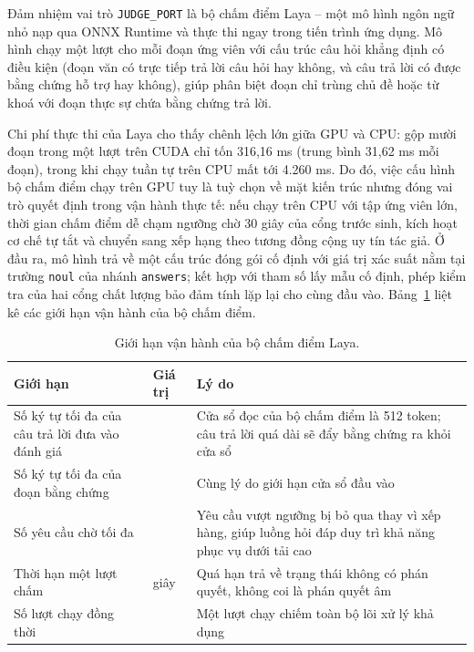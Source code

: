 Đảm nhiệm vai trò \texttt{JUDGE\_PORT} là bộ chấm điểm Laya -- một mô hình ngôn ngữ nhỏ nạp qua ONNX Runtime và thực thi ngay trong tiến trình ứng dụng. Mô hình chạy một lượt cho mỗi đoạn ứng viên với cấu trúc câu hỏi khẳng định có điều kiện (đoạn văn có trực tiếp trả lời câu hỏi hay không, và câu trả lời có được bằng chứng hỗ trợ hay không), giúp phân biệt đoạn chỉ trùng chủ đề hoặc từ khoá với đoạn thực sự chứa bằng chứng trả lời.

Chi phí thực thi của Laya cho thấy chênh lệch lớn giữa GPU và CPU: gộp mười đoạn trong một lượt trên CUDA chỉ tốn 316,16 ms (trung bình 31,62 ms mỗi đoạn), trong khi chạy tuần tự trên CPU mất tới 4.260 ms. Do đó, việc cấu hình bộ chấm điểm chạy trên GPU tuy là tuỳ chọn về mặt kiến trúc nhưng đóng vai trò quyết định trong vận hành thực tế: nếu chạy trên CPU với tập ứng viên lớn, thời gian chấm điểm dễ chạm ngưỡng chờ 30 giây của cổng trước sinh, kích hoạt cơ chế tự tắt và chuyển sang xếp hạng theo tương đồng cộng uy tín tác giả. Ở đầu ra, mô hình trả về một cấu trúc đóng gói cố định với giá trị xác suất nằm tại trường \texttt{noul} của nhánh \texttt{answers}; kết hợp với tham số lấy mẫu cố định, phép kiểm tra của hai cổng chất lượng bảo đảm tính lặp lại cho cùng đầu vào. Bảng~\ref{tab:gioi-han-bo-cham-diem} liệt kê các giới hạn vận hành của bộ chấm điểm.

\begin{table}[htbp]
    \centering
    \caption{Giới hạn vận hành của bộ chấm điểm Laya.}
    \label{tab:gioi-han-bo-cham-diem}
    \small
    \begin{tabularx}{\textwidth}{@{}>{\raggedright\arraybackslash}p{4.8cm}>{\raggedright\arraybackslash}p{2.3cm}>{\raggedright\arraybackslash}X@{}}
        \toprule
        \textbf{Giới hạn} & \textbf{Giá trị} & \textbf{Lý do} \\
        \midrule
        Số ký tự tối đa của câu trả lời đưa vào đánh giá & 900 & Cửa sổ đọc của bộ chấm điểm là 512 token; câu trả lời quá dài sẽ đẩy bằng chứng ra khỏi cửa sổ \\
        Số ký tự tối đa của đoạn bằng chứng & 1.100 & Cùng lý do giới hạn cửa sổ đầu vào \\
        Số yêu cầu chờ tối đa & 8 & Yêu cầu vượt ngưỡng bị bỏ qua thay vì xếp hàng, giúp luồng hỏi đáp duy trì khả năng phục vụ dưới tải cao \\
        Thời hạn một lượt chấm & 30 giây & Quá hạn trả về trạng thái không có phán quyết, không coi là phán quyết âm \\
        Số lượt chạy đồng thời & 1 & Một lượt chạy chiếm toàn bộ lõi xử lý khả dụng \\
        \bottomrule
    \end{tabularx}
\end{table}

